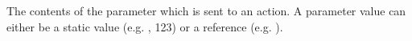 \item[Parameter Value]{
The contents of the parameter which is sent to an action. A parameter value can either be a static value (e.g. , 123) or a reference (e.g. ).
}
